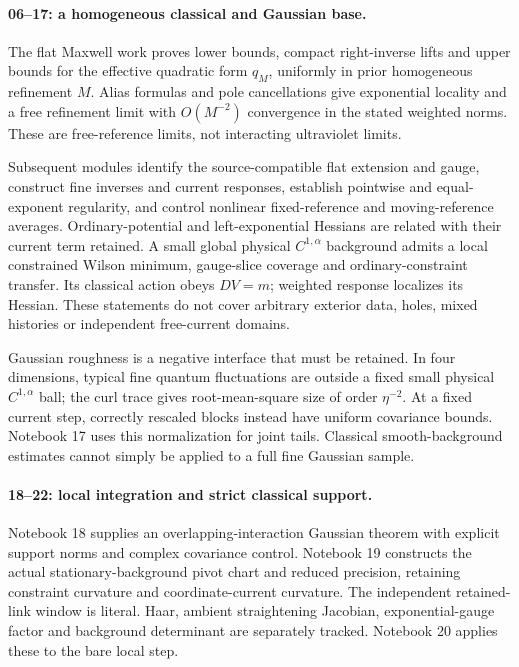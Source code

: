 \documentclass[11pt]{article}
\theoremstyle{remark}
\begin{document}
\paragraph{06--17: a homogeneous classical and Gaussian base.}
The flat Maxwell work proves lower bounds,
compact right-inverse lifts and upper bounds for
the effective quadratic form \(q_M\), uniformly
in prior homogeneous refinement \(M\).
Alias formulas and pole cancellations give
exponential locality and a free refinement
limit with \(O(M^{-2})\) convergence in the
stated weighted norms. These are free-reference
limits, not interacting ultraviolet limits.

Subsequent modules identify the source-compatible
flat extension and gauge, construct fine inverses
and current responses, establish pointwise and
equal-exponent regularity, and control nonlinear
fixed-reference and moving-reference averages.
Ordinary-potential and left-exponential Hessians
are related with their current term retained.
A small global physical \(C^{1,\alpha}\)
background admits a local constrained Wilson
minimum, gauge-slice coverage and ordinary-constraint
transfer. Its classical action obeys \(DV=m\);
weighted response localizes its Hessian.
These statements do not cover arbitrary exterior
data, holes, mixed histories or independent
free-current domains.

Gaussian roughness is a negative interface
that must be retained. In four dimensions,
typical fine quantum fluctuations are outside
a fixed small physical \(C^{1,\alpha}\) ball;
the curl trace gives root-mean-square size
of order \(\eta^{-2}\). At a fixed current
step, correctly rescaled blocks instead
have uniform covariance bounds. Notebook 17
uses this normalization for joint tails.
Classical smooth-background estimates cannot
simply be applied to a full fine Gaussian sample.

\paragraph{18--22: local integration and strict classical support.}
Notebook 18 supplies an overlapping-interaction
Gaussian theorem with explicit support norms
and complex covariance control. Notebook 19
constructs the actual stationary-background
pivot chart and reduced precision, retaining
constraint curvature and coordinate-current
curvature. The independent retained-link
window is literal. Haar, ambient straightening
Jacobian, exponential-gauge factor and
background determinant are separately tracked.
Notebook 20 applies these to the bare local step.
\end{document}
